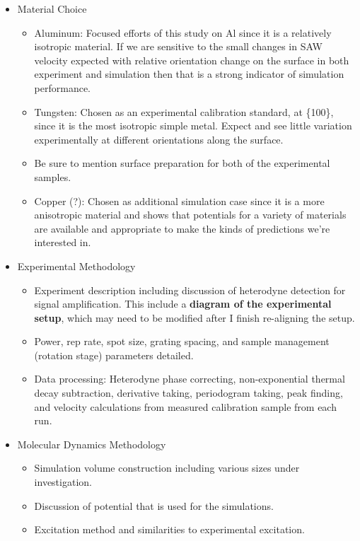 
\begin{itemize}
\item Material Choice
	\begin{itemize}
	\item Aluminum: Focused efforts of this study on Al since it is a relatively isotropic material. If we are sensitive to the small changes in SAW velocity expected with relative orientation change on the surface in both experiment and simulation then that is a strong indicator of simulation performance.
	\item Tungsten: Chosen as an experimental calibration standard, at \{100\}, since it is the most isotropic simple metal. Expect and see little variation experimentally at different orientations along the surface. 
	\item Be sure to mention surface preparation for both of the experimental samples. 
	\item Copper (?): Chosen as additional simulation case since it is a more anisotropic material and shows that potentials for a variety of materials are available and appropriate to make the kinds of predictions we're interested in.
	\end{itemize}
\item Experimental Methodology
	\begin{itemize}
	\item Experiment description including discussion of heterodyne detection for signal amplification. This include a \textbf{diagram of the experimental setup}, which may need to be modified after I finish re-aligning the setup. 
	\item Power, rep rate, spot size, grating spacing, and sample management (rotation stage) parameters detailed.
	\item Data processing: Heterodyne phase correcting, non-exponential thermal decay subtraction, derivative taking, periodogram taking, peak finding, and velocity calculations from measured calibration sample from each run.
	\end{itemize}
\item Molecular Dynamics Methodology
	\begin{itemize}
	\item Simulation volume construction including various sizes under investigation.
	\item Discussion of potential that is used for the simulations.
	\item Excitation method and similarities to experimental excitation.

\end{itemize}
\end{itemize}
